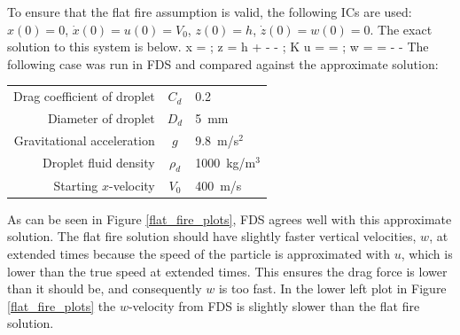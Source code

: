 \documentclass[11pt]{book}
\begin{document}
To ensure that the flat fire assumption is valid, the following ICs are used: $x(0) = 0$, $\dot{x}(0) = u(0) = V_0$, $z(0) = h$, $\dot{z}(0) = w(0) = 0$. The exact solution to this system is below.
\be
	x =  \quad ; \quad
	z = h +  -  -  \quad ; \quad
	K \equiv {}
\ee
\be
	u =  =  \quad ; \quad w =  =  -  - 
\ee
The following case was run in FDS and compared against the approximate solution:
\begin{center}
\begin{tabular}{|r|c|l|}
\hline
Drag coefficient of droplet & $C_d$ & 0.2 \\
Diameter of droplet & $D_d$ & 5~mm \\
Gravitational acceleration & $g$ & 9.8~m/s$^2$ \\
Droplet fluid density & $\rho_d$ & 1000~kg/m$^3$ \\
Starting $x$-velocity & $V_0$ & 400~m/s \\
\hline
\end{tabular}
\end{center}
As can be seen in Figure \ref{flat_fire_plots}, FDS agrees well with this approximate solution. The flat fire solution should have slightly faster vertical velocities, $w$, at extended times because the speed of the particle is approximated with $u$, which is lower than the true speed at extended times. This ensures the drag force is lower than it should be, and consequently $w$ is too fast. In the lower left plot in Figure \ref{flat_fire_plots} the $w$-velocity from FDS is slightly slower than the flat fire solution.
\end{document}
